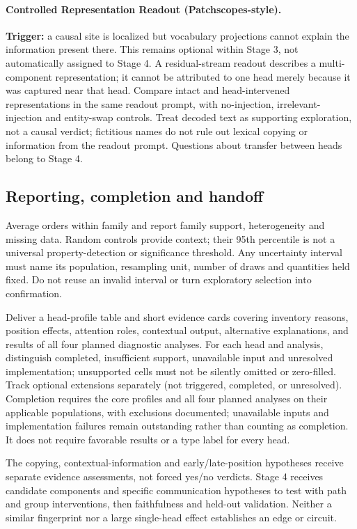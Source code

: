 \documentclass[11pt,a4paper]{article}
\begin{document}
\paragraph{Controlled Representation Readout (Patchscopes-style).}
\textbf{Trigger:} a causal site is localized but vocabulary projections cannot
explain the information present there. This remains optional within Stage 3,
not automatically assigned to Stage 4. A residual-stream readout describes a
multi-component representation; it cannot be attributed to one head merely because
it was captured near that head. Compare intact and head-intervened representations
in the same readout prompt, with no-injection, irrelevant-injection and entity-swap
controls. Treat decoded text as supporting exploration, not a causal verdict;
fictitious names do not rule out lexical copying or information from the readout
prompt. Questions about transfer between heads belong to Stage 4.

\subsection{Reporting, completion and handoff}
Average orders within family and report family support, heterogeneity and missing
data. Random controls provide context; their 95th percentile is not a universal
property-detection or significance threshold. Any uncertainty interval must name
its population, resampling unit, number of draws and quantities held fixed.
Do not reuse an invalid interval or turn exploratory selection into confirmation.

Deliver a head-profile table and short evidence cards covering inventory reasons,
position effects, attention roles, contextual output, alternative explanations,
and results of all four planned diagnostic analyses. For each head and analysis,
distinguish completed, insufficient support, unavailable input and unresolved
implementation; unsupported cells must not be silently omitted or zero-filled.
Track optional extensions separately (not triggered, completed, or unresolved).
Completion requires the core profiles and all four planned analyses on their
applicable populations, with exclusions documented; unavailable inputs and
implementation failures remain outstanding rather than counting as completion.
It does not require favorable results or a type label for every head.

The copying, contextual-information and early/late-position hypotheses receive
separate evidence assessments, not forced yes/no verdicts. Stage 4 receives
candidate components and specific communication hypotheses to test with path and
group interventions, then faithfulness and held-out validation. Neither a similar
fingerprint nor a large single-head effect establishes an edge or circuit.
\end{document}

